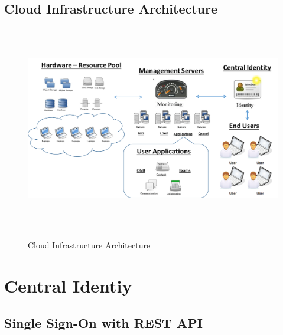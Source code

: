 \documentclass[12pt]{report}
\begin{document}
\section{Cloud Infrastructure Architecture}

\begin{figure}[H]
\begin{center}
 \includegraphics[height=9cm,width=14cm]{./all.png} \\ 
\caption{Cloud Infrastructure Architecture \label{fig: Cloud Infrastructure Architecture }} 
\end{center}
\end{figure}

\chapter{Central Identiy}

\section{Single Sign-On with REST API}
\end{document}
